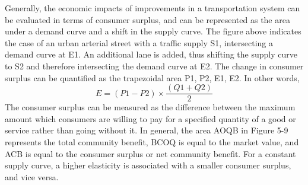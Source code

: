 Generally, the economic impacts of improvements in a transportation system can be evaluated in terms of consumer surplus, and can be represented as the area under a demand curve and a shift in the supply curve. The figure above indicates the case of an urban arterial street with a traffic supply S1, intersecting a demand curve at E1. An additional lane is added, thus shifting the supply curve to S2 and therefore intersecting the demand curve at E2. The change in consumer surplus can be quantified as the trapezoidal area P1, P2, E1, E2. In other words,
$$ E = (P1 - P2)\times \frac{(Q1 + Q2)}{2}$$
The consumer surplus can be measured as the difference between the maximum amount which consumers are willing to pay for a specified quantity of a good or service rather than going without it. In general, the area AOQB in Figure 5-9 represents the total community benefit, BCOQ is equal to the market value, and ACB is equal to the consumer surplus or net community benefit. For a constant supply curve, a higher elasticity is associated with a smaller consumer surplus, and vice versa.
